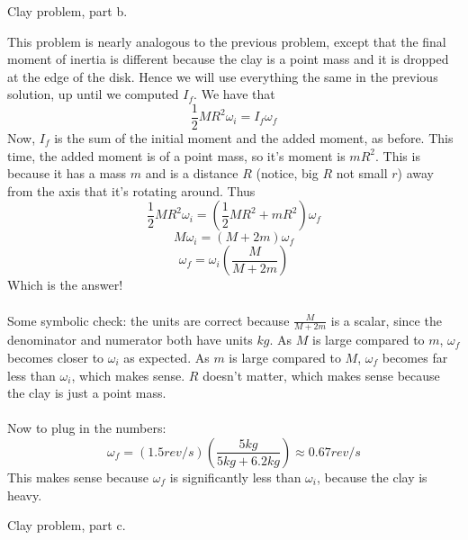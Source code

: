 \documentclass[11pt]{scrartcl}
\begin{document}
\begin{example}
  Clay problem, part b.
\end{example}
\begin{soln}
  This problem is nearly analogous to the previous problem, except that the
  final moment of inertia is different because the clay is a point mass and it is dropped at
  the edge of the disk. Hence we will use everything the same in the previous solution,
  up until we computed $I_f$. We have that
  $$\frac{1}{2}MR^2 \omega_i=I_f \omega_f$$
  Now, $I_f$ is the sum of the initial moment and the added moment, as before.
  This time, the added moment is of a point mass, so it's moment is $mR^2$.
  This is because it has a mass $m$ and is a distance $R$ (notice, big $R$ not small $r$)
  away from the axis that it's rotating around. Thus
  $$\frac{1}{2}MR^2 \omega_i=\left(\frac{1}{2}MR^2+mR^2\right)\omega_f$$
  $$M \omega_i = (M+2m)\omega_f$$
  $$\omega_f=\omega_i\left(\frac{M}{M+2m}\right)$$
  Which is the answer!
  \\ \\
  Some symbolic check: the units are correct because $\frac{M}{M+2m}$ is a scalar,
  since the denominator and numerator both have units $kg$. As $M$ is large compared to $m$,
  $\omega_f$ becomes closer to $\omega_i$ as expected. As $m$ is large compared to $M$,
  $\omega_f$ becomes far less than $\omega_i$, which makes sense. $R$ doesn't matter,
  which makes sense because the clay is just a point mass.
  \\ \\
  Now to plug in the numbers:
  $$\omega_f=(1.5 rev/s)\left(\frac{5 kg}{5kg+6.2kg}\right)\approx 0.67 rev/s$$
  This makes sense because $\omega_f$ is significantly less than $\omega_i$, because the clay is heavy.
\end{soln}
\begin{example}
  Clay problem, part c.
\end{example}
\end{document}

